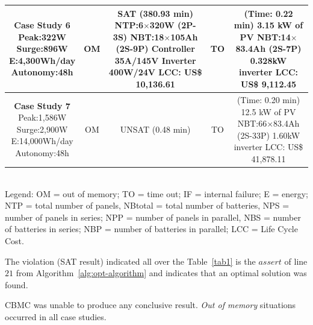 \documentclass[runningheads]{llncs}
\begin{document}
\begin{table}
\begin{scriptsize}
\begin{tabular}{c|c|c|c|c}
\hline
\makecell{\textbf{Case Study 6}\\Peak:322W\\Surge:896W\\E:4,300Wh/day\\Autonomy:48h} & OM & \makecell {SAT (380.93 min) \\NTP:6$\times$320W (2P-3S)\\NBT:18$\times$105Ah (2S-9P)\\Controller 35A/145V\\Inverter 400W/24V \\LCC: US\$ 10,136.61} & TO & \makecell{(Time: 0.22 min)\\3.15 kW of PV\\NBT:14$\times$83.4Ah (2S-7P)\\0.328kW inverter\\LCC: US\$ 9,112.45} \\
\hline
\makecell{\textbf{Case Study 7}\\Peak:1,586W\\Surge:2,900W\\E:14,000Wh/day\\Autonomy:48h} & OM & UNSAT (0.48 min) & TO & \makecell{(Time: 0.20 min)\\12.5 kW of PV\\NBT:66$\times$83.4Ah (2S-33P)\\1.60kW inverter\\LCC: US\$ 41,878.11} \\
\hline
\hline
\end{tabular}
\\Legend: OM = out of memory; TO = time out; IF = internal failure; E = energy;        NTP = total number of panels, NBtotal = total number of batteries, NPS = number of panels in series; NPP = number of panels in parallel, NBS = number of batteries in series; NBP = number of batteries in parallel; LCC = Life Cycle Cost.
\end{scriptsize}
\end{table}

The violation (SAT result) indicated all over the Table~\ref{tab1} 
is the $assert$ of line $21$ from Algorithm~\ref{alg:opt-algorithm} and indicates that an optimal solution was found.

CBMC was unable to produce any conclusive result. \textit{Out of memory} situations occurred in all case studies.
\end{document}
